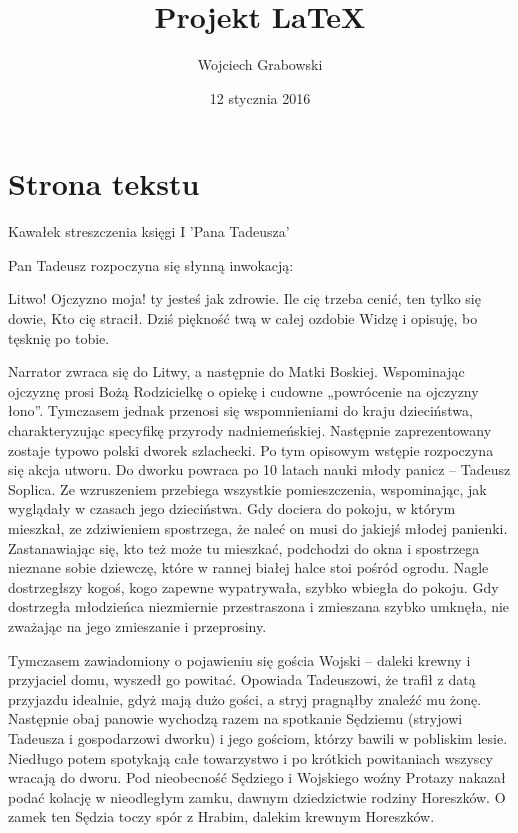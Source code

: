 \documentclass[12pt]{article}
\title{Projekt LaTeX}
\author{Wojciech Grabowski}
\date{12 stycznia 2016}
\begin{document}
\maketitle
\tableofcontents
\newpage

\section{Strona tekstu}

Kawałek streszczenia księgi I 'Pana Tadeusza'


Pan Tadeusz rozpoczyna się słynną inwokacją:



Litwo! Ojczyzno moja! ty jesteś jak zdrowie.
Ile cię trzeba cenić, ten tylko się dowie,
Kto cię stracił. Dziś piękność twą w całej ozdobie
Widzę i opisuję, bo tęsknię po tobie.



Narrator zwraca się do Litwy, a następnie do Matki Boskiej. Wspominając ojczyznę prosi Bożą Rodzicielkę o opiekę i cudowne „powrócenie na ojczyzny łono”. 
Tymczasem jednak przenosi się wspomnieniami do kraju dzieciństwa, charakteryzując specyfikę przyrody nadniemeńskiej. Następnie zaprezentowany zostaje typowo polski dworek szlachecki. 
Po tym opisowym wstępie rozpoczyna się akcja utworu.
Do dworku powraca po 10 latach nauki młody panicz – Tadeusz Soplica. Ze wzruszeniem przebiega wszystkie pomieszczenia, wspominając, jak wyglądały w czasach jego dzieciństwa. 
Gdy dociera do pokoju, w którym mieszkał, ze zdziwieniem spostrzega, że naleć on musi do jakiejś młodej panienki. 
Zastanawiając się, kto też może tu mieszkać, podchodzi do okna i spostrzega nieznane sobie dziewczę, które w rannej białej halce stoi pośród ogrodu. 
Nagle dostrzegłszy kogoś, kogo zapewne wypatrywała, szybko wbiegła do pokoju. 
Gdy dostrzegła młodzieńca niezmiernie przestraszona i zmieszana szybko umknęła, nie zważając na jego zmieszanie i przeprosiny.

Tymczasem zawiadomiony o pojawieniu się gościa Wojski – daleki krewny i przyjaciel domu, wyszedł go powitać. 
Opowiada Tadeuszowi, że trafił z datą przyjazdu idealnie, gdyż mają dużo gości, a stryj pragnąłby znaleźć mu żonę. 
Następnie obaj panowie wychodzą razem na spotkanie Sędziemu (stryjowi Tadeusza i gospodarzowi dworku) i jego gościom, którzy bawili w pobliskim lesie. 
Niedługo potem spotykają całe towarzystwo i po krótkich powitaniach wszyscy wracają do dworu. 
Pod nieobecność Sędziego i Wojskiego woźny Protazy nakazał podać kolację w nieodległym zamku, dawnym dziedzictwie rodziny Horeszków. 
O zamek ten Sędzia toczy spór z Hrabim, dalekim krewnym Horeszków.
\end{document}
